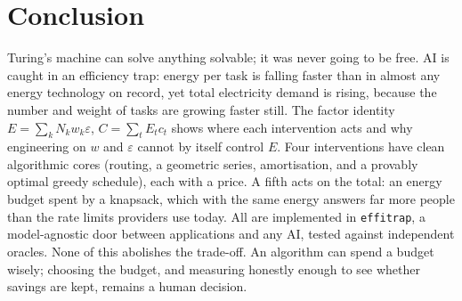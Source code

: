 \documentclass[11pt]{article}
\theoremstyle{definition}
\theoremstyle{remark}
\begin{document}
\section{Conclusion}
Turing's machine can solve anything solvable; it was never going to be free. AI is caught in an efficiency trap: energy per task is falling faster than in almost any energy technology on record, yet total electricity demand is rising, because the number and weight of tasks are growing faster still. The factor identity $E=\sum_k N_k w_k \varepsilon$, $C=\sum_t E_t c_t$ shows where each intervention acts and why engineering on $w$ and $\varepsilon$ cannot by itself control $E$. Four interventions have clean algorithmic cores (routing, a geometric series, amortisation, and a provably optimal greedy schedule), each with a price. A fifth acts on the total: an energy budget spent by a knapsack, which with the same energy answers far more people than the rate limits providers use today. All are implemented in \texttt{effitrap}, a model-agnostic door between applications and any AI, tested against independent oracles. None of this abolishes the trade-off. An algorithm can spend a budget wisely; choosing the budget, and measuring honestly enough to see whether savings are kept, remains a human decision.
\end{document}
